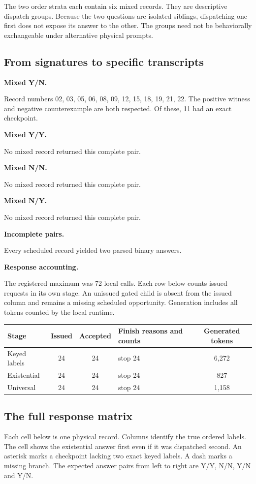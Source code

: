 \documentclass[12pt,letterpaper]{article}
\newcommand{\reading}[2]{\par\smallskip\textsf{\color{accent}\bfseries #1}\enspace #2\par}
\begin{document}
The two order strata each contain six mixed records. They are descriptive dispatch groups. Because the two questions are isolated siblings, dispatching one first does not expose its answer to the other. The groups need not be behaviorally exchangeable under alternative physical prompts.

\subsection{From signatures to specific transcripts}

\reading{Mixed Y/N.}{}Record numbers 02, 03, 05, 06, 08, 09, 12, 15, 18, 19, 21, 22. The positive witness and negative counterexample are both respected. Of these, 11 had an exact checkpoint.

\reading{Mixed Y/Y.}{}No mixed record returned this complete pair.

\reading{Mixed N/N.}{}No mixed record returned this complete pair.

\reading{Mixed N/Y.}{}No mixed record returned this complete pair.

\reading{Incomplete pairs.}{}Every scheduled record yielded two parsed binary answers.

\reading{Response accounting.}{} The registered maximum was 72 local calls. Each row below counts issued requests in its own stage. An unissued gated child is absent from the issued column and remains a missing scheduled opportunity. Generation includes all tokens counted by the local runtime.

\begin{center}{\small\setlength{\tabcolsep}{4pt}\begin{tabularx}{\linewidth}{@{}YccYc@{}}\toprule
Stage & Issued & Accepted & Finish reasons and counts & Generated tokens\\\midrule
Keyed labels & 24 & 24 & stop 24 & 6,272\\
Existential & 24 & 24 & stop 24 & 827\\
Universal & 24 & 24 & stop 24 & 1,158\\
\bottomrule\end{tabularx}}\end{center}

\subsection{The full response matrix}

Each cell below is one physical record. Columns identify the true ordered labels. The cell shows the existential answer first even if it was dispatched second. An asterisk marks a checkpoint lacking two exact keyed labels. A dash marks a missing branch. The expected answer pairs from left to right are Y/Y, N/N, Y/N and Y/N.
\end{document}
